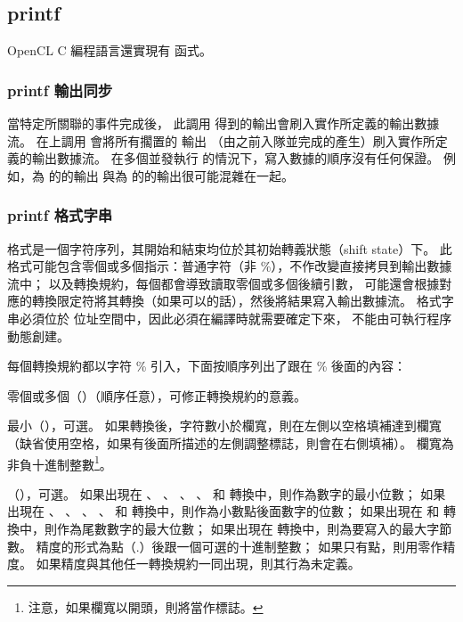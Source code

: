 \subsection{printf}

OpenCL C 編程語言還實現有  函式。

{}

\subsubsection{printf 輸出同步}

當特定所關聯的事件完成後，
此調用  得到的輸出會刷入實作所定義的輸出數據流。
在上調用  會將所有擱置的  輸出
（由之前入隊並完成的產生）刷入實作所定義的輸出數據流。
在多個並發執行  的情況下，寫入數據的順序沒有任何保證。
例如，為 的的輸出
與為 的的輸出很可能混雜在一起。

\subsubsection{printf 格式字串}

格式是一個字符序列，其開始和結束均位於其初始轉義狀態（shift state）下。
此格式可能包含零個或多個指示：普通字符（非 \%），不作改變直接拷貝到輸出數據流中；
以及轉換規約，每個都會導致讀取零個或多個後續引數，
可能還會根據對應的轉換限定符將其轉換（如果可以的話），然後將結果寫入輸出數據流。
格式字串必須位於  位址空間中，因此必須在編譯時就需要確定下來，
不能由可執行程序動態創建。

每個轉換規約都以字符 \% 引入，下面按順序列出了跟在 \% 後面的內容：
\startigBase
\item 零個或多個{}（{}）（順序任意），可修正轉換規約的意義。

\item 最小{}（{}），可選。
如果轉換後，字符數小於欄寬，則在左側以空格填補達到欄寬
（缺省使用空格，如果有後面所描述的左側調整標誌，則會在右側填補）。
欄寬為非負十進制整數\footnote{注意，如果欄寬以{}開頭，則將{}當作標誌。}。

\item {}（{}），可選。
如果出現在 、 、 、 、
  和  轉換中，則作為數字的最小位數；
如果出現在 、 、 、 、
  和  轉換中，則作為小數點後面數字的位數；
如果出現在  和  轉換中，則作為尾數數字的最大位數；
如果出現在  轉換中，則為要寫入的最大字節數。
精度的形式為點（.）後跟一個可選的十進制整數；
如果只有點，則用零作精度。
如果精度與其他任一轉換規約一同出現，則其行為未定義。

